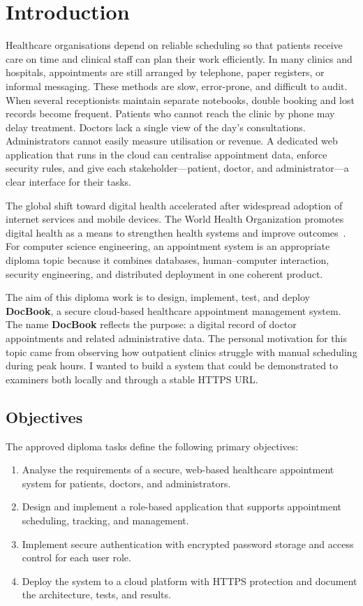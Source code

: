 \chapter{Introduction}

Healthcare organisations depend on reliable scheduling so that patients receive care on time and clinical staff can plan their work efficiently. In many clinics and hospitals, appointments are still arranged by telephone, paper registers, or informal messaging. These methods are slow, error-prone, and difficult to audit. When several receptionists maintain separate notebooks, double booking and lost records become frequent. Patients who cannot reach the clinic by phone may delay treatment. Doctors lack a single view of the day's consultations. Administrators cannot easily measure utilisation or revenue. A dedicated web application that runs in the cloud can centralise appointment data, enforce security rules, and give each stakeholder---patient, doctor, and administrator---a clear interface for their tasks.

The global shift toward digital health accelerated after widespread adoption of internet services and mobile devices. The World Health Organization promotes digital health as a means to strengthen health systems and improve outcomes~\cite{who2024}. For computer science engineering, an appointment system is an appropriate diploma topic because it combines databases, human--computer interaction, security engineering, and distributed deployment in one coherent product.

The aim of this diploma work is to design, implement, test, and deploy \textbf{DocBook}, a secure cloud-based healthcare appointment management system. The name \textbf{DocBook} reflects the purpose: a digital record of doctor appointments and related administrative data. The personal motivation for this topic came from observing how outpatient clinics struggle with manual scheduling during peak hours. I wanted to build a system that could be demonstrated to examiners both locally and through a stable HTTPS URL.

\section{Objectives}

The approved diploma tasks define the following primary objectives:

\begin{enumerate}
  \item Analyse the requirements of a secure, web-based healthcare appointment system for patients, doctors, and administrators.
  \item Design and implement a role-based application that supports appointment scheduling, tracking, and management.
  \item Implement secure authentication with encrypted password storage and access control for each user role.
  \item Deploy the system to a cloud platform with HTTPS protection and document the architecture, tests, and results.
\end{enumerate}

